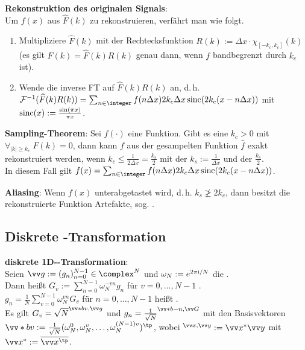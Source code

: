 \textbf{Rekonstruktion des originalen Signals}:\\
Um $f(x)$ aus $\widehat{F}(k)$ zu rekonstruieren, verfährt man wie folgt.
\begin{enumerate}
    \item
    Multipliziere $\widehat{F}(k)$ mit der Rechtecksfunktion
    $R(k) := \Delta x \cdot \chi_{[-k_c,k_c]}(k)$\\
    (es gilt $F(k) = \widehat{F}(k) R(k)$ genau dann, wenn $f$ bandbegrenzt durch $k_c$ ist).
    
    \item
    Wende die inverse FT auf $\widehat{F}(k) R(k)$ an, d.\,h.\\
    $\F^{-1}(\widehat{F}(k) R(k))
    = \sum_{n \in \integer} f(n\Delta x) 2k_c \Delta x \sinc(2k_c (x - n\Delta x))$
    mit $\operatorname{sinc}(x) := \frac{\sin(\pi x)}{\pi x}$.
\end{enumerate}

\textbf{Sampling-Theorem}:
Sei $f(\cdot)$ eine Funktion.
Gibt es eine  $k_c > 0$
mit $\forall_{|k| \ge k_c}\; F(k) = 0$, dann kann $f$ aus der
gesampelten Funktion $\widehat{f}$ exakt rekonstruiert werden,
wenn $k_c \le \frac{1}{2 \Delta x} = \frac{k_s}{2}$
mit der  $k_s := \frac{1}{\Delta x}$ und
der  $\frac{k_s}{2}$.\\
In diesem Fall gilt
$f(x) = \sum_{n \in \integer} f(n\Delta x) 2k_c \Delta x \sinc(2k_c (x - n\Delta x))$.

\textbf{Aliasing}:
Wenn $f(x)$ unterabgetastet wird, d.\,h. $k_s \not\ge 2k_c$,
dann besitzt die rekonstruierte Funktion Artefakte, sog. .

\subsection{%
    Diskrete -Transformation%
}

\textbf{diskrete 1D--Transformation}:\\
Seien $\vec{g} := (g_n)_{n=0}^{N-1} \in \complex^N$
und $\omega_N := e^{2\pi\text{i}/N}$ die .\\
Dann heißt
$G_v := \sum_{n=0}^{N-1} \omega_N^{-vn} g_n$ für $v = 0, \dotsc, N - 1$
.\\
$g_n = \frac{1}{N} \sum_{v=0}^{N-1} \omega_N^{vn} G_v$ für $n = 0, \dotsc, N - 1$
heißt .\\
Es gilt $G_v = \sqrt{N} \sp{\vec*{b}{v}, \vec{g}}$
und $g_n = \frac{1}{\sqrt{N}} \sp{\vec*{b}{-n}, \vec{G}}$ mit den Basisvektoren\\
$\vec*{b}{v} := \frac{1}{\sqrt{N}}
(\omega_N^0, \omega_N^{v}, \dotsc, \omega_N^{(N-1)v})^\tp$,
wobei $\sp{\vec{x}, \vec{y}} := \vec{x}^\ast \vec{y}$ mit
$\vec{x}^\ast := \overline{\vec{x}^\tp}$.

